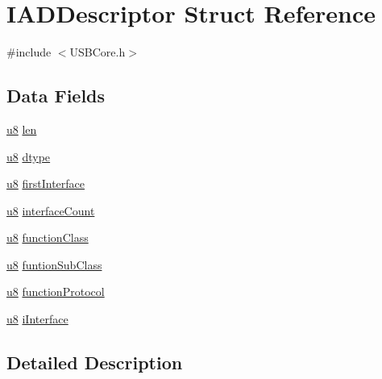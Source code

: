 \hypertarget{struct_i_a_d_descriptor}{}\section{I\+A\+D\+Descriptor Struct Reference}
\label{struct_i_a_d_descriptor}


{\ttfamily \#include $<$U\+S\+B\+Core.\+h$>$}

\subsection*{Data Fields}
\begin{DoxyCompactItemize}
\item 
\hyperlink{_u_s_b_a_p_i_8h_aed742c436da53c1080638ce6ef7d13de}{u8} \hyperlink{struct_i_a_d_descriptor_afbf3f3230446569534d5f466aaf4c23b}{len}
\item 
\hyperlink{_u_s_b_a_p_i_8h_aed742c436da53c1080638ce6ef7d13de}{u8} \hyperlink{struct_i_a_d_descriptor_a0bb419531ec75697e63e9109fecf81b0}{dtype}
\item 
\hyperlink{_u_s_b_a_p_i_8h_aed742c436da53c1080638ce6ef7d13de}{u8} \hyperlink{struct_i_a_d_descriptor_a1f310829bc6b0452ca7a433306711834}{first\+Interface}
\item 
\hyperlink{_u_s_b_a_p_i_8h_aed742c436da53c1080638ce6ef7d13de}{u8} \hyperlink{struct_i_a_d_descriptor_ace4364c3a11490d83a57929409bab191}{interface\+Count}
\item 
\hyperlink{_u_s_b_a_p_i_8h_aed742c436da53c1080638ce6ef7d13de}{u8} \hyperlink{struct_i_a_d_descriptor_acf3f3dd7456fc16e020aff6bbe0f9573}{function\+Class}
\item 
\hyperlink{_u_s_b_a_p_i_8h_aed742c436da53c1080638ce6ef7d13de}{u8} \hyperlink{struct_i_a_d_descriptor_a6e072e7ab27ae52a925d022757a6abd1}{funtion\+Sub\+Class}
\item 
\hyperlink{_u_s_b_a_p_i_8h_aed742c436da53c1080638ce6ef7d13de}{u8} \hyperlink{struct_i_a_d_descriptor_a451c6c7831d9e3e3898951c5d036081f}{function\+Protocol}
\item 
\hyperlink{_u_s_b_a_p_i_8h_aed742c436da53c1080638ce6ef7d13de}{u8} \hyperlink{struct_i_a_d_descriptor_a08ba0e1160648c2e45d24d1f00484466}{i\+Interface}
\end{DoxyCompactItemize}


\subsection{Detailed Description}


